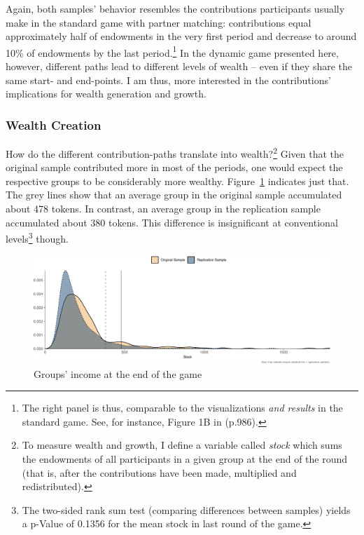\documentclass[
  authoryear,
  preprint,
  3p]{elsarticle}
\begin{document}
Again, both samples' behavior resembles the contributions participants
usually make in the standard game with partner matching: contributions
equal approximately half of endowments in the very first period and
decrease to around 10\% of endowments by the last period.\footnote{The
  right panel is thus, comparable to the visualizations \emph{and
  results} in the standard game. See, for instance, Figure 1B in
  \citet{fehrgaechter2000} (p.986).} In the dynamic game presented here,
however, different paths lead to different levels of wealth -- even if
they share the same start- and end-points. I am thus, more interested in
the contributions' implications for wealth generation and growth.

\hypertarget{sec-wealth}{%
\subsubsection{Wealth Creation}\label{sec-wealth}}

How do the different contribution-paths translate into
wealth?\footnote{To measure wealth and growth, I define a variable
  called \emph{stock} which sums the endowments of all participants in a
  given group at the end of the round (that is, after the contributions
  have been made, multiplied and redistributed).} Given that the
original sample contributed more in most of the periods, one would
expect the respective groups to be considerably more wealthy.
Figure~\ref{fig-stock-distribution} indicates just that. The grey lines
show that an average group in the original sample accumulated about 478
tokens. In contrast, an average group in the replication sample
accumulated about 380 tokens. This difference is insignificant at
conventional levels\footnote{The two-sided rank sum test (comparing
  differences between samples) yields a p-Value of 0.1356 for the mean
  stock in last round of the game.} though.

\begin{figure}

{\centering \includegraphics{paper_files/figure-pdf/fig-stock-distribution-1.pdf}

}

\caption{\label{fig-stock-distribution}Groups' income at the end of the
game}

\end{figure}
\end{document}
